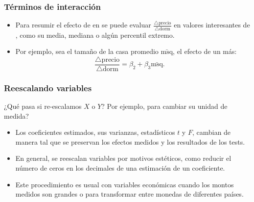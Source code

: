 \documentclass{beamer}
\begin{document}
\begin{frame}
\frametitle{Términos de interacción}

\begin{itemize}
    \item Para resumir el efecto de  en  se puede evaluar \(\frac{\triangle \text{precio}}{\triangle \text{dorm}}\) en valores interesantes de , como su media, mediana o algún percentil extremo.
    \item Por ejemplo, sea el tamaño de la casa promedio \(\bar{\text{msq}}\), el efecto de un  más:
    \[
    \frac{\triangle \text{precio}}{\triangle \text{dorm}} = \beta_2 + \beta_3\bar{\text{msq}}. \quad 
    \]
    
\end{itemize}

\end{frame}
\begin{frame}
\frametitle{Reescalando variables}
¿Qué pasa si re-escalamos \(X\) o \(Y\)? Por ejemplo, para cambiar su unidad de medida?
\begin{itemize}

    \item Los coeficientes estimados, sus varianzas, estadísticos \(t\) y \(F\), cambian de manera tal que se preservan los efectos medidos y los resultados de los tests.
    \item En general, se reescalan variables por motivos estéticos, como reducir el número de ceros en los decimales de una estimación de un coeficiente.
    \item Este procedimiento es usual con variables económicas cuando los montos medidos son grandes o para transformar entre monedas de diferentes países.
\end{itemize}

\end{frame}
\end{document}
